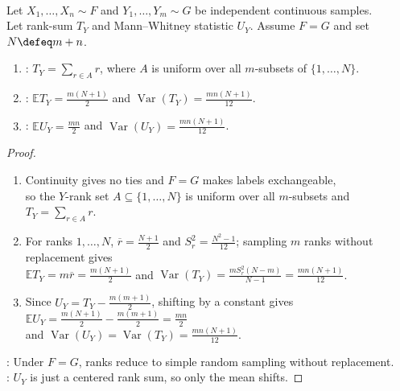 \begin{theorem} \label{thm:mann-whitney-rank-sum-mean-variance} \\
Let $X_1,\ldots,X_n\sim F$ and $Y_1,\ldots,Y_m\sim G$ be independent continuous samples.\\
Let rank-sum $T_Y$ and Mann--Whitney statistic $U_Y$. Assume $F=G$ and set $N\defeq m+n$.
\begin{enumerate}[label=(\roman*)]
\setlength{\itemsep}{0pt}
\item {}: $T_Y=\sum\limits_{r\in A}r$, where $A$ is uniform over all $m$-subsets of $\{1,\ldots,N\}$.
\item {}: $\mathbb{E}T_Y=\frac{m(N+1)}{2}$ and $\operatorname{Var}(T_Y)=\frac{mn(N+1)}{12}$.
\item {}: $\mathbb{E}U_Y=\frac{mn}{2}$ and $\operatorname{Var}(U_Y)=\frac{mn(N+1)}{12}$.
\end{enumerate}
\begin{proof}
\begin{enumerate}[label=(\roman*)]
\setlength{\itemsep}{0pt}
\item Continuity gives no ties and $F=G$ makes labels exchangeable,\\
so the $Y$-rank set $A\subseteq\{1,\ldots,N\}$ is uniform over all $m$-subsets and $T_Y=\sum\limits_{r\in A}r$.
\item For ranks $1,\ldots,N$, $\overline{r}=\frac{N+1}{2}$ and $S_r^2=\frac{N^2-1}{12}$; sampling $m$ ranks without replacement gives\\
$\mathbb{E}T_Y=m\overline{r}=\frac{m(N+1)}{2}$ and $\operatorname{Var}(T_Y)=\frac{mS_r^2(N-m)}{N-1}=\frac{mn(N+1)}{12}$.
\item Since $U_Y=T_Y-\frac{m(m+1)}{2}$, shifting by a constant gives $\mathbb{E}U_Y=\frac{m(N+1)}{2}-\frac{m(m+1)}{2}=\frac{mn}{2}$\\
and $\operatorname{Var}(U_Y)=\operatorname{Var}(T_Y)=\frac{mn(N+1)}{12}$.
\end{enumerate}
: Under $F=G$, ranks reduce to simple random sampling without replacement.\\
: $U_Y$ is just a centered rank sum, so only the mean shifts.
\end{proof}
\end{theorem}

